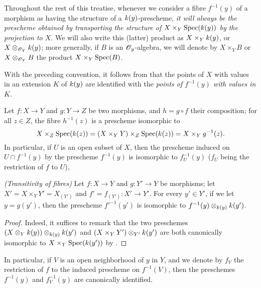 \begin{env}[3.6.2]
\label{I.3.6.2}
Throughout the rest of this treatise, whenever we consider a fibre $f^{-1}(y)$ of a morphism as having the structure of a $k(y)$-prescheme, \emph{it will always be the prescheme obtained by transporting the structure of $X\times_Y\operatorname{Spec}(k(y))$ by the projection to $X$}.
We will also write this (latter) product as $X\times_Yk(y)$, or $X\otimes_{\mathscr{O}_Y}k(y)$; more generally, if $B$ is an $\mathscr{O}_y$-algebra, we will denote by $X\times_Y B$ or $X\otimes_{\mathscr{O}_Y}B$ the product $X\times_Y\operatorname{Spec}(B)$.
\end{env}

With the preceding convention, it follows from  that the points of $X$ with values in an extension $K$ of $k(y)$ are identified with the \emph{points of $f^{-1}(y)$ with values in $K$}.

\begin{env}[3.6.3]
\label{I.3.6.3}
Let $f:X\to Y$ and $g:Y\to Z$ be two morphisms, and $h=g\circ f$ their composition; for all $z\in Z$, the fibre $h^{-1}(z)$ is a prescheme isomorphic to
\[
  X\times_Z\operatorname{Spec}(k(z))=(X\times_Y Y)\times_Z\operatorname{Spec}(k(z))=X\times_Y g^{-1}(z).
\]
In particular, if $U$ is an open subset of $X$, then the prescheme induced on $U\cap f^{-1}(y)$ by the prescheme $f^{-1}(y)$ is isomorphic to $f^{-1}_U(y)$ ($f_U$ being the restriction of $f$ to $U$),
\end{env}

\begin{proposition}[3.6.4]
\label{I.3.6.4}
\emph{(Transitivity of fibres)}
Let $f:X\to Y$ and $g:Y'\to Y$ be morphisms; let $X'=X\times_Y Y'=X_{(Y')}$ and $f'=f_{(Y')}:X'\to Y'$.
For every $y'\in Y'$, if we let $y=g(y')$, then the prescheme $f'^{-1}(y')$ is isomorphic to $f^{-1}(y)\otimes_{k(y)}k(y')$.
\end{proposition}

\begin{proof}
Indeed, it suffices to remark that the two preschemes $(X\otimes_Yk(y))\otimes_{k(y)}k(y')$ and $(X\times_Y Y')\otimes_{Y'}k(y')$ are both canonically isomorphic to $X\times_Y\operatorname{Spec}(k(y'))$ by .
\end{proof}

In particular, if $V$ is an open neighborhood of $y$ in $Y$, and we denote by $f_V$ the restriction of $f$ to the induced prescheme on $f^{-1}(V)$, then the preschemes $f^{-1}(y)$ and $f^{-1}_V(y)$ are canonically identified.

